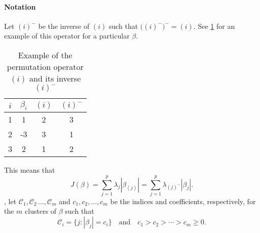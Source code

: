 \paragraph{Notation}\label{sec:notation}

Let \((i)^{-}\) be the inverse of \((i)\) such that
\(\big((i)^-\big)^- = (i)\). See \cref{tab:permutation-example} for an
example of this operator for a particular \(\beta\).
\begin{table}
  \centering
  \caption{Example of the permutation operator \((i)\) and its inverse
    \((i)^-\)\label{tab:permutation-example}}
  \begin{tabular}{cccc}
    \toprule
    \(i\) & \(\beta_i\) & \((i)\) & \((i)^-\) \\
    \midrule
    1     & 1         & 2              & 3                \\
    2     & -3        & 3              & 1                \\
    3     & 2         & 1              & 2                \\
    \bottomrule
  \end{tabular}
\end{table}
This means that
\[
  J(\beta) = \sum_{j=1}^p \lambda_j |\beta_{(j)}|
  = \sum_{j=1}^p \lambda_{(j)^-}|\beta_j|.
\]
, let \(\mathcal{C}_1, \mathcal{C}_2\, \dots, \mathcal{C}_m\) and \(c_1,
c_2, \dots, c_m\) be the indices and coefficients, respectively, for the \(m\)
clusters of $\beta$ such that
\[
  \mathcal{C}_i = \{j : |\beta_j| = c_i\} \quad \text{and} \quad
  c_1 > c_2 > \cdots > c_m \geq 0.
\]

